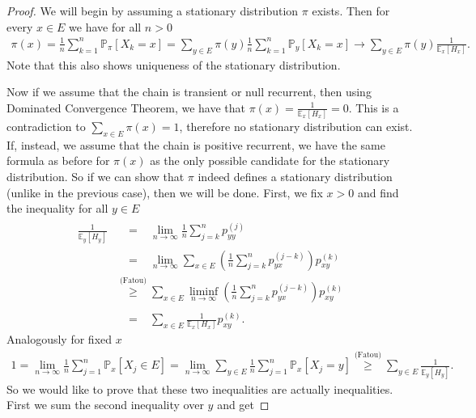 \begin{proof}
	We will begin by assuming a stationary distribution $\pi$ exists. Then for every $x \in E$ we have for all $n> 0$
	\begin{align}
		\pi (x) = \frac{1}{n} \sum_{k=1}^{n} \mathbb{P}_{\pi } \left[ X_k=x \right]  = \sum_{y \in E}^{} \pi(y) \frac{1}{n} \sum_{k=1}^{n} \mathbb{P}_{y} \left[ X_k = x \right] \to \sum_{y \in E}^{} \pi (y) \frac{1}{\mathbb{E}_{x} \left[ H_x \right] }	
	.\end{align}	
	Note that this also shows uniqueness of the stationary distribution.

	Now if we assume that the chain is transient or null recurrent, then using Dominated Convergence Theorem, we have that $\pi (x) = \frac{1}{\mathbb{E}_{x} \left[ H_x \right] } = 0$. This is a contradiction to $\sum_{x \in E}^{} \pi (x) = 1$, therefore no stationary distribution can exist.
	If, instead, we assume that the chain is positive recurrent, we have the same formula as before for $\pi (x)$ as the only possible candidate for the stationary distribution. So if we can show that $\pi $ indeed defines a stationary distribution (unlike in the previous case), then we will be done. First, we fix $x> 0$ and find the inequality for all $y \in E$ 
\begin{align}
\frac{1}{\mathbb{E}_{y} \left[ H_y \right] } &\stackrel{\phantom{\textrm{(Fatou)}}}{=} \lim_{n\to \infty} \frac{1}{n} \sum_{j=k}^{n} p_{yy}^{(j)} \\
					     &\stackrel{\phantom{\textrm{(Fatou)}}}{=}  \lim_{n \to \infty} \sum_{x \in E}^{} \left( \frac{1}{n} \sum_{j=k}^{n} p_{yx}^{(j-k)} \right) p_{xy}^{(k)} \\
					     &\stackrel{\textrm{(Fatou)}}{\geq} \sum_{x \in E}^{}  \liminf_{n \to \infty } \left( \frac{1}{n} \sum_{j=k}^{n} p_{yx}^{(j-k)} \right) p_{xy}^{(k)} \\
					     &\stackrel{\phantom{\textrm{(Fatou)}}}{=}  \sum_{x \in E}^{} \frac{1}{\mathbb{E}_{x} \left[ H_x \right] } p_{xy}^{(k)}.
\end{align}
Analogously for fixed $x$
\begin{align}
	1 = \lim_{n \to \infty } \frac{1}{n} \sum_{j=1}^{n} \mathbb{P}_{x} \left[ X_j \in E \right] = \lim_{n\to \infty }\sum_{y \in E}^{}  \frac{1}{n} \sum_{j=1}^{n}\mathbb{P}_{x} \left[ X_j = y \right] \stackrel{\textrm{(Fatou)}}{\geq} \sum_{y \in E}^{} \frac{1}{\mathbb{E}_{y} \left[ H_y \right] }
.\end{align}
So we would like to prove that these two inequalities are actually inequalities. First we sum the second inequality over $y$ and get

\end{proof}
